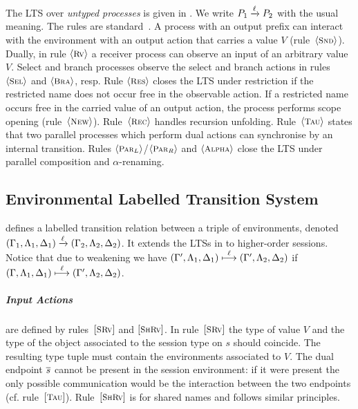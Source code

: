 \documentclass[a4paper,UKenglish]{lipics}
\theoremstyle{definition}
\begin{document}
The %
LTS
over \emph{untyped processes}
is given in
. 
We write $P_1 \xrightarrow{\ell} P_2$ with the usual meaning.
The rules are standard~\cite{KYHH2015,KY2015}.
A process with an output prefix can
interact with the environment with an output action that carries a value
$V$ (rule~$\ltsrule{Snd}$).  Dually, in rule $\ltsrule{Rv}$ a
receiver process can observe an input of an arbitrary value $V$.
Select and branch processes observe the select and branch
actions in rules $\ltsrule{Sel}$ and $\ltsrule{Bra}$, resp.
Rule $\ltsrule{Res}$ closes the LTS under restriction 
if the restricted name does not occur free in the
observable action. 
If a restricted name occurs free in
the carried value of an output action,
the process performs scope opening (rule~$\ltsrule{New}$).  
Rule~$\ltsrule{Rec}$ handles recursion unfolding.
Rule~$\ltsrule{Tau}$ 
states that two parallel processes which perform
dual actions can synchronise by an internal transition.
Rules $\ltsrule{Par${}_L$}$/$\ltsrule{Par${}_R$}$ 
and $\ltsrule{Alpha}$ close the LTS
under parallel composition and $\alpha$-renaming. 

\subsection{Environmental Labelled Transition System}
\label{ss:elts}
\noi 
{}
defines a labelled transition relation between 
a triple of environments, 
denoted
$(\Gamma_1, \Lambda_1, \Delta_1) \xrightarrow{\ell} (\Gamma_2, \Lambda_2, \Delta_2)$.
It extends the LTSs
in \cite{KYHH2015,KY2015} 
to higher-order sessions. 
Notice that due to weakening %
we have 
$(\Gamma', \Lambda_1, \Delta_1) \stackrel{\ell}{\longmapsto} (\Gamma', \Lambda_2, \Delta_2)$
if
$(\Gamma, \Lambda_1, \Delta_1) \stackrel{\ell}{\longmapsto} (\Gamma', \Lambda_2, \Delta_2)$.



\subparagraph{Input Actions} 
are defined by 
rules~$\eltsrule{SRv}$ and $\eltsrule{ShRv}$.
In rule~$\eltsrule{SRv}$
the type of value $V$
and the type of the object associated to the session type on $s$ 
should coincide. 
The resulting type tuple must contain the environments 
associated to $V$. 
The %
dual endpoint $\overline{s}$ cannot be
present in the session environment: if it were present
the only possible communication would be the interaction
between the two endpoints (cf. rule~$\eltsrule{Tau}$).
Rule~$\eltsrule{ShRv}$ is for shared names and follows similar principles.
\end{document}
